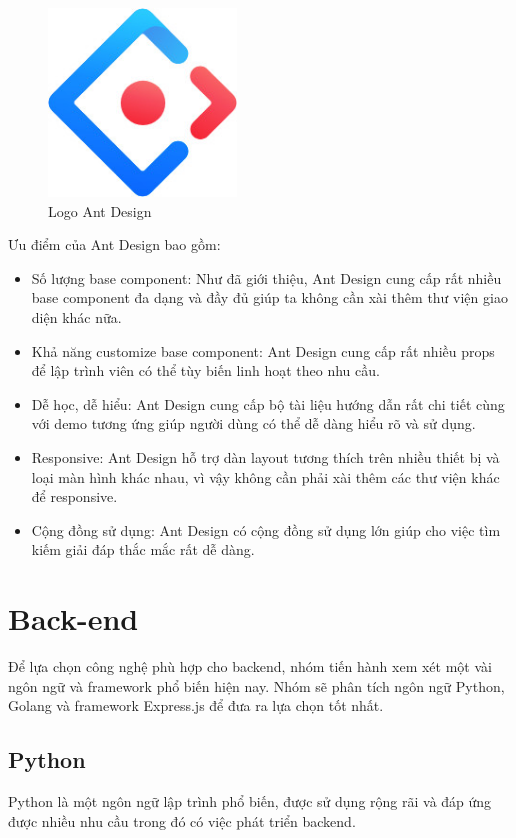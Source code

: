 \begin{figure}[!htp]
    \begin{center}
        \includegraphics[width=5cm]{img/Technology/antd.jpg}
    \end{center}
    \caption{Logo Ant Design \cite{technologyAntd}}
\end{figure}

\hspace*{0.5cm} Ưu điểm của Ant Design bao gồm:
\begin{itemize}
    \item Số lượng base component: Như đã giới thiệu, Ant Design cung cấp rất nhiều base component đa dạng và đầy đủ giúp ta không cần xài thêm thư viện giao diện khác nữa.
    \item Khả năng customize base component: Ant Design cung cấp rất nhiều props để lập trình viên có thể tùy biến linh hoạt theo nhu cầu.
    \item Dễ học, dễ hiểu: Ant Design cung cấp bộ tài liệu hướng dẫn rất chi tiết cùng với demo tương ứng giúp người dùng có thể dễ dàng hiểu rõ và sử dụng.
    \item Responsive: Ant Design hỗ trợ dàn layout tương thích trên nhiều thiết bị và loại màn hình khác nhau, vì vậy không cần phải xài thêm các thư viện khác để responsive.
    \item Cộng đồng sử dụng: Ant Design có cộng đồng sử dụng lớn giúp cho việc tìm kiếm giải đáp thắc mắc rất dễ dàng.
\end{itemize}


\section{Back-end}
Để lựa chọn công nghệ phù hợp cho backend, nhóm tiến hành xem xét một vài ngôn ngữ và framework phổ biến hiện nay. Nhóm sẽ phân tích ngôn ngữ Python, Golang và framework Express.js để đưa ra lựa chọn tốt nhất.

\subsection{Python}
Python là một ngôn ngữ lập trình phổ biến, được sử dụng rộng rãi và đáp ứng được nhiều nhu cầu trong đó có việc phát triển backend.

